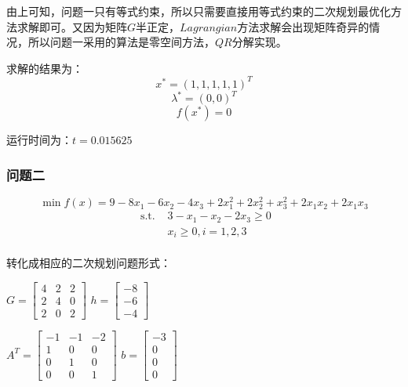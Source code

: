 \documentclass[12pt]{article}
\begin{document}
	          由上可知，问题一只有等式约束，所以只需要直接用等式约束的二次规划最优化方法求解即可。又因为矩阵$G$半正定，$Lagrangian$方法求解会出现矩阵奇异的情况，所以问题一采用的算法是零空间方法，$QR$分解实现。
	          
	          求解的结果为：
	          \[x^{\ast} = (1,1,1,1,1)^T\]
	          \[\lambda^{\ast} = (0,0)^T \]
	          \[f(x^{\ast}) = 0 \]
	          
	          运行时间为：$t = 0.015625$
	          
	          \vspace{15pt}
	       
	       \subsubsection{问题二}
	          \[\min f(x) = 9 - 8x_1 - 6x_2 - 4x_3 + 2x_1^2 + 2x_2^2 + x_3^2 + 2x_1x_2 +2x_1x_3 \]
	          \begin{align*}
	          \text{ s.t. } & 3 - x_1 - x_2 -2x_3 \ge 0 \\
	          & x_i \ge 0, i = 1,2,3 \\
	          \end{align*}
	          
	          转化成相应的二次规划问题形式：
	          \vspace{5pt}
	          \begin{center}
	          	
	          	$G = \begin{bmatrix}
	          	4 & 2 & 2 \\
	          	2 & 4 & 0 \\
	          	2 & 0 & 2
	          	\end{bmatrix}$ \qquad
	          	$h = \begin{bmatrix}
	          	-8 \\ -6 \\ -4
	          	\end{bmatrix}$
	          \end{center}
	          
	          \vspace{5pt}
	          
	          \begin{center}
	          	
	          	$A^T = \begin{bmatrix}
	          	-1 & -1 & -2 \\
	          	1 & 0 & 0 \\
	          	0 & 1 & 0 \\
	          	0 & 0 & 1 
	          	\end{bmatrix}$ \qquad
	          	$b = \begin{bmatrix}
	          	-3 \\ 0 \\ 0 \\ 0
	          	\end{bmatrix}$
	          \end{center}
	          \vspace{5pt}
	          
\end{document}
